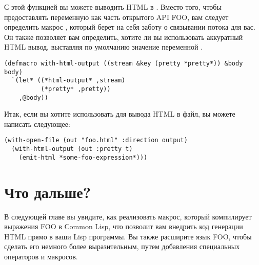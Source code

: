 С этой функцией вы можете выводить HTML в . Вместо того, чтобы
предоставлять переменную  как часть открытого API FOO, вам следует
определить макрос , который берет на себя заботу о связывании
потока для вас. Он также позволяет вам определить, хотите ли вы использовать аккуратный
HTML вывод, выставляя по умолчанию значение переменной .

\begin{lstlisting}
(defmacro with-html-output ((stream &key (pretty *pretty*)) &body body)
  `(let* ((*html-output* ,stream)
          (*pretty* ,pretty))
    ,@body))
\end{lstlisting}

Итак, если вы хотите использовать  для вывода HTML в файл, вы можете
написать следующее:

\begin{lstlisting}
(with-open-file (out "foo.html" :direction output)
  (with-html-output (out :pretty t)
    (emit-html *some-foo-expression*)))
\end{lstlisting}

\section{Что дальше?}

В следующей главе вы увидите, как реализовать макрос, который компилирует выражения FOO в
Common Lisp, что позволит вам внедрить код генерации HTML прямо в ваши Lisp программы. Вы
также расширите язык FOO, чтобы сделать его немного более выразительным, путем добавления
специальных операторов и макросов.

